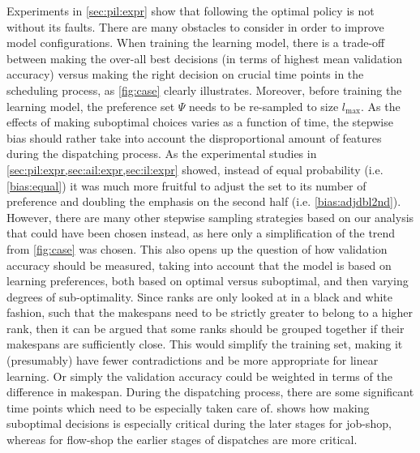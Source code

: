 \documentclass[twocolumn]{svjour3}
\begin{document}
Experiments in \cref{sec:pil:expr} show that following the optimal
policy is not without its faults. There are many obstacles to consider in order 
to improve model configurations. 
When training the learning model, there is a trade-off between making the 
over-all best decisions (in terms of highest mean validation accuracy) versus 
making the right decision on crucial time points in the scheduling process, as 
\cref{fig:case} clearly illustrates. 
Moreover, before training the learning model, the preference set $\Psi$ 
needs to be re-sampled to size $l_{\max}$. 
As the effects of making suboptimal choices varies as a function of time, the 
stepwise bias should rather take into account the disproportional amount of 
features during the dispatching process. 
As the experimental studies in \cref{sec:pil:expr,sec:ail:expr,sec:il:expr} 
showed, instead of equal probability (i.e. \ref{bias:equal}) it was much more 
fruitful to adjust the set to its number of preference and doubling the 
emphasis on the second half (i.e. \ref{bias:adjdbl2nd}).
However, there are many other stepwise sampling strategies based on our 
analysis that could have been chosen instead, as here only a 
simplification of the trend from \cref{fig:case} was chosen. 
This also opens up the question of how validation accuracy should be measured, 
taking into account that the model is based on learning preferences, both based 
on optimal versus suboptimal, and then varying degrees of sub-optimality. 
Since ranks are only looked at in a black and white fashion, such that the 
makespans need to be strictly greater to belong to a higher rank, then it can 
be argued that some ranks should be grouped together if their makespans are 
sufficiently close. 
This would simplify the training set, making it (presumably) have fewer
contradictions and be more appropriate for linear learning. Or simply the 
validation accuracy could be weighted in terms of the difference in makespan.
During the dispatching process, there are some significant time points which 
need to be especially taken care of. 
 shows how making suboptimal decisions is especially critical 
during the later stages for job-shop, whereas for flow-shop the earlier stages 
of dispatches are more critical. 
\end{document}
